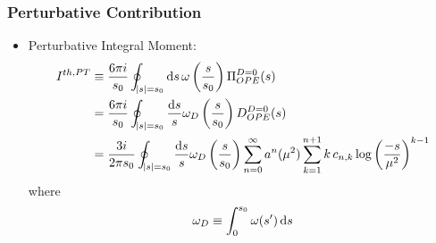 \documentclass{beamer}
\begin{document}
\begin{frame}
  \frametitle{Perturbative Contribution}
  \begin{itemize}
  \item Perturbative Integral Moment:
    \begin{equation}
      \begin{split}
      I^{th,PT} &\equiv \frac{6 \pi i}{s_0} \oint_{\abs{s}=s_0} \dif s\, \omega\left(\frac{s}{s_0}\right) \Pi_{OPE}^{D=0}(s) \\
      &= \frac{6 \pi i}{s_0} \oint_{\abs{s}=s_0} \frac{\dif s}{s} \omega_D\left(\frac{s}{s_0}\right) D_{OPE}^{D=0}(s) \\
      &= \frac{3 i}{2 \pi s_0} \oint_{\abs{s}=s_0} \frac{\dif s}{s} \omega_D\left(\frac{s}{s_0}\right) \sum_{n=0}^\infty a^n(\mu^2) \sum_{k=1}^{n+1} k\, c_{n,k} \log\left( \frac{-s}{\mu^2} \right)^{k-1}
    \end{split}
  \end{equation}
    where
    \begin{equation}
      \omega_D \equiv \int_0^{s_0} \omega(s^\prime) \dif s
    \end{equation}
  \end{itemize}
\end{frame}
\end{document}
